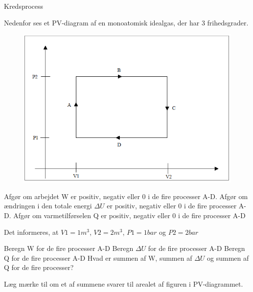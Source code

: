\documentclass[crop=false, class=memoir]{standalone}
\begin{document}
\begin{opgave}{Kredsprocess}

\noindent
Nedenfor ses et PV-diagram af en monoatomisk idealgas, der har 3 frihedsgrader.
\begin{figure}[H]
    \centering
    \includegraphics[scale=0.7]{Termodynamik/fig/Term3.png}
\end{figure}

\opg Afgør om arbejdet W er positiv, negativ eller 0 i de fire processer A-D.
\opg Afgør om ændringen i den totale energi $\Delta U$ er positiv, negativ eller 0 i de fire processer A-D.
\opg Afgør om varmetilførselen Q er positiv, negativ eller 0 i de fire processer A-D

\noindent
Det informeres, at $V1=1m^3$, $V2=2m^3$, $P1=1bar$ og $P2=2bar$

\opg Beregn W for de fire processer A-D
\opg Beregn $\Delta U$ for de fire processer A-D
\opg Beregn Q for de fire processer A-D
\opg Hvad er summen af W, summen af $\Delta U$ og summen af Q for de fire processer?

\noindent
Læg mærke til om et af summene svarer til arealet af figuren i PV-diagrammet.
\end{opgave}
\end{document}
